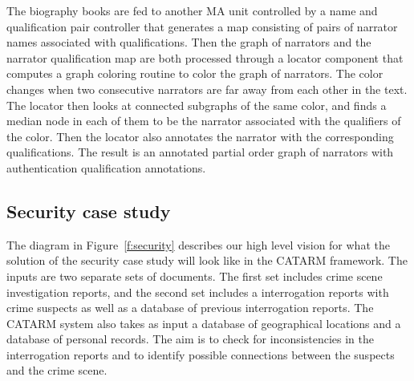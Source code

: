 \documentclass[12pt]{article}
\begin{document}
{The biography books are fed to another MA unit controlled by 
a name and qualification pair controller that generates a 
map consisting of pairs of narrator names associated with 
qualifications. 
Then the graph of narrators and the narrator qualification map
are both processed through a locator component that computes
a graph coloring routine to color the graph of narrators. 
The color changes when two consecutive narrators are far away
from each other in the text. 
The locator then looks at connected subgraphs of the same color,
and finds a median node in each of them to be the narrator 
associated with the qualifiers of the color. 
Then the locator also annotates the narrator with the 
corresponding qualifications. 
The result is an annotated partial order graph of narrators
with authentication qualification annotations. 

\subsection{Security case study}
\label{s:design:sec}

\begin{figure}
\end{figure}


The diagram in Figure~\ref{f:security} describes our 
high level vision for what the solution of the 
security case study
will look like in the CATARM framework. 
The inputs are two separate sets of documents. 
The first set includes crime scene investigation reports, 
and the second set includes a 
interrogation reports with crime suspects as well as 
a database of previous interrogation reports. 
The CATARM system also takes as input a database of geographical
locations and a database of personal records. 
The aim is to check for inconsistencies in the interrogation
reports and to identify possible connections between the suspects
and the crime scene. 

}
\end{document}
